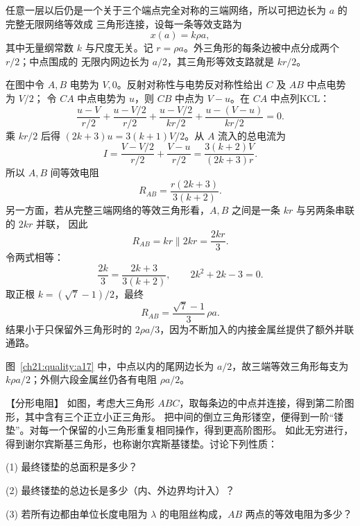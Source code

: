 {\begin{xesolution}
任意一层以后仍是一个关于三个端点完全对称的三端网络，所以可把边长为 $a$ 的完整无限网络等效成
三角形连接，设每一条等效支路为
\[
  x(a)=k\rho a,
\]
其中无量纲常数 $k$ 与尺度无关。记 $r=\rho a$。外三角形的每条边被中点分成两个 $r/2$；中点围成的
无限内网边长为 $a/2$，其三角形等效支路就是 $kr/2$。

\par\noindent\begin{minipage}{\linewidth}
\nestedTriangleRecursionFigure
{}
\end{minipage}\par\medskip

在图中令 $A,B$ 电势为 $V,0$。反射对称性与电势反对称性给出 $C$ 及 $AB$ 中点电势为 $V/2$；
令 $CA$ 中点电势为 $u$，则 $CB$ 中点为 $V-u$。在 $CA$ 中点列KCL：
\[
 \frac{u-V}{r/2}+\frac{u-V/2}{r/2}
 +\frac{u-V/2}{kr/2}+\frac{u-(V-u)}{kr/2}=0.
\]
乘 $kr/2$ 后得 $(2k+3)u=3(k+1)V/2$。从 $A$ 流入的总电流为
\[
 I=\frac{V-V/2}{r/2}+\frac{V-u}{r/2}
 =\frac{3(k+2)V}{(2k+3)r}.
\]
所以 $A,B$ 间等效电阻
\[
  R_{AB}=\frac{r(2k+3)}{3(k+2)}.
\]
另一方面，若从完整三端网络的等效三角形看，$A,B$ 之间是一条 $kr$ 与另两条串联的 $2kr$ 并联，
因此
\[
  R_{AB}=kr\parallel 2kr=\frac{2kr}{3}.
\]
令两式相等：
\[
  \frac{2k}{3}=\frac{2k+3}{3(k+2)},
  \qquad 2k^2+2k-3=0.
\]
取正根 $k=(\sqrt7-1)/2$，最终
\[
  \boxed{R_{AB}=\frac{\sqrt7-1}{3}\,\rho a}.
\]
结果小于只保留外三角形时的 $2\rho a/3$，因为不断加入的内接金属丝提供了额外并联通路。

图~\ref{ch21:quality:a17} 中，中点以内的尾网边长为 $a/2$，故三端等效三角形每支为 $k\rho a/2$；外侧六段金属丝仍各有电阻 $\rho a/2$。
\end{xesolution}



\begin{origexamplebox}{【分形电阻】}\label{ch21:ex:s37-6-10}
如图，考虑大三角形 $ABC$，取每条边的中点并连接，得到第二阶图形，其中含有三个正立小正三角形。
把中间的倒立三角形镂空，便得到一阶“镂垫”。对每一个保留的小三角形重复相同操作，得到更高阶图形。
如此无穷进行，得到谢尔宾斯基三角形，也称谢尔宾斯基镂垫。讨论下列性质：

(1) 最终镂垫的总面积是多少？

(2) 最终镂垫的总边长是多少（内、外边界均计入）？

(3) 若所有边都由单位长度电阻为 $\lambda$ 的电阻丝构成，$AB$ 两点的等效电阻为多少？


\end{origexamplebox}}
